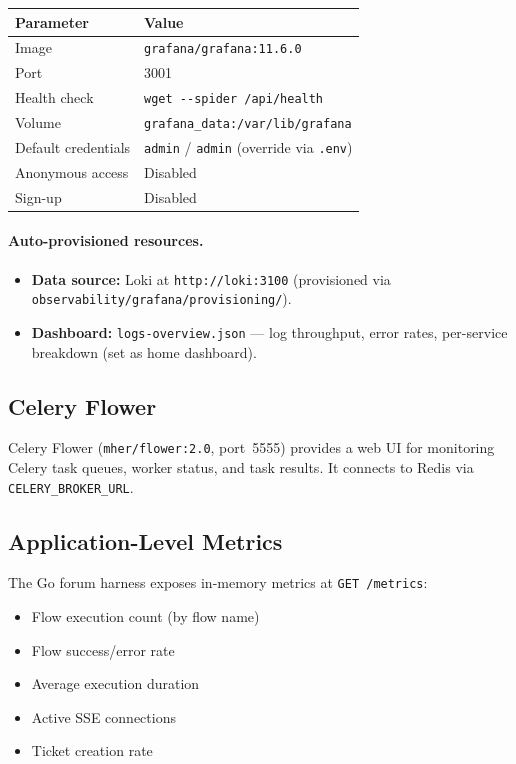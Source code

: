 \begin{tabular}{@{}ll@{}}
\toprule
\textbf{Parameter}    & \textbf{Value} \\
\midrule
Image                 & \texttt{grafana/grafana:11.6.0} \\
Port                  & 3001 \\
Health check          & \texttt{wget -{}-spider /api/health} \\
Volume                & \texttt{grafana\_data:/var/lib/grafana} \\
Default credentials   & \texttt{admin} / \texttt{admin} (override via \texttt{.env}) \\
Anonymous access      & Disabled \\
Sign-up               & Disabled \\
\bottomrule
\end{tabular}

\paragraph{Auto-provisioned resources.}

\begin{itemize}
  \item \textbf{Data source:} Loki at \texttt{http://loki:3100}
        (provisioned via \texttt{observability/grafana/provisioning/}).
  \item \textbf{Dashboard:} \texttt{logs-overview.json} — log throughput,
        error rates, per-service breakdown (set as home dashboard).
\end{itemize}

\subsection{Celery Flower}

Celery Flower (\texttt{mher/flower:2.0}, port~5555) provides a web UI for
monitoring Celery task queues, worker status, and task results.  It connects
to Redis via \texttt{CELERY\_BROKER\_URL}.

\subsection{Application-Level Metrics}

The Go forum harness exposes in-memory metrics at \texttt{GET /metrics}:

\begin{itemize}
  \item Flow execution count (by flow name)
  \item Flow success/error rate
  \item Average execution duration
  \item Active SSE connections
  \item Ticket creation rate
\end{itemize}
